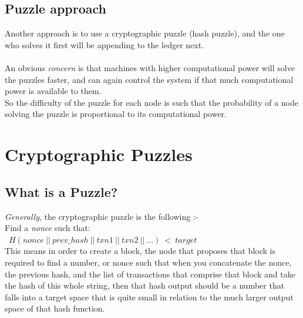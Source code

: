 \documentclass[10pt,a4paper]{article}
\begin{document}
\subsection{Puzzle approach}
Another approach is to use a cryptographic puzzle (hash puzzle), and the one who solves it first will be appending to the ledger next.\\\\
An obvious \emph{concern} is that machines with higher computational power will solve the puzzles faster, and can again control the system if that much computational power is available to them.\\
So the difficulty of the puzzle for each node is such that the probability of a node solving the puzzle is proportional to its computational power. 


\section{Cryptographic Puzzles}

\subsection{What is a Puzzle?}
\emph{Generally}, the cryptographic puzzle is the following :-\\

Find a \emph{nonce} such that:\\\
  $H(nonce\ ||\ prev\_hash\ ||\ txn1\ ||\ txn2\ ||\ ...)\ <\ target$
\\

This means in order to create a block, the node that proposes that block is required to find a number, or nonce such that when you concatenate the nonce, the previous hash, and the list of transactions that comprise that block and take the hash of this whole string, then that hash output should be a number that falls into a target space that is quite small in relation to the much larger output space of that hash function.\\
\end{document}
